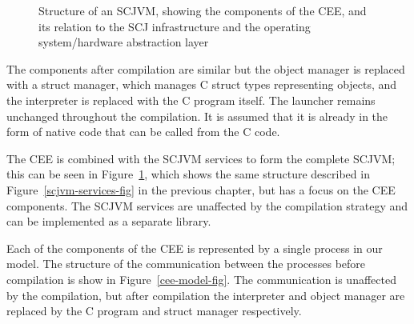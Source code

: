 \begin{figure}[bth]
  \caption{Structure of an SCJVM, showing the components of the CEE,
    and its relation to the SCJ infrastructure and the operating
    system/hardware abstraction layer}
  \label{cee-fig}
\end{figure}

The components after compilation are similar but the object manager is
replaced with a struct manager, which manages C struct types
representing objects, and the interpreter is replaced with the C
program itself.
The launcher remains unchanged throughout the compilation.
It is assumed that it is already in the form of native code that can
be called from the C code.

The CEE is combined with the SCJVM services to form the complete
SCJVM; this can be seen in Figure~\ref{cee-fig}, which shows the same
structure described in Figure~\ref{scjvm-services-fig} in the previous
chapter, but has a focus on the CEE components.
The SCJVM services are unaffected by the compilation strategy and can
be implemented as a separate library.

Each of the components of the CEE is represented by a single \Circus{}
process in our model.
The structure of the communication between the processes before
compilation is show in Figure~\ref{cee-model-fig}.
The communication is unaffected by the compilation, but after
compilation the interpreter and object manager are replaced by the C
program and struct manager respectively.

